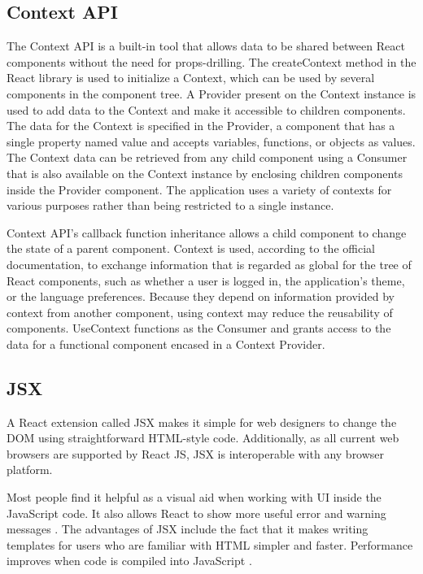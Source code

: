\subsection{Context API}
The Context API is a built-in tool that allows data to be shared between React components without the need for props-drilling. The createContext method in the React library is used to initialize a Context, which can be used by several components in the component tree. A Provider present on the Context instance is used to add data to the Context and make it accessible to children components. The data for the Context is specified in the Provider, a component that has a single property named value and accepts variables, functions, or objects as values. The Context data can be retrieved from any child component using a Consumer that is also available on the Context instance by enclosing children components inside the Provider component. The application uses a variety of contexts for various purposes rather than being restricted to a single instance.

Context API's callback function inheritance allows a child component to change the state of a parent component. Context is used, according to the official documentation, to exchange information that is regarded as global for the tree of React components, such as whether a user is logged in, the application's theme, or the language preferences. Because they depend on information provided by context from another component, using context may reduce the reusability of components. UseContext functions as the Consumer and grants access to the data for a functional component encased in a Context Provider.

\subsection{JSX}
A React extension called JSX makes it simple for web designers to change the DOM using straightforward HTML-style code. Additionally, as all current web browsers are supported by React JS, JSX is interoperable with any browser platform.

Most people find it helpful as a visual aid when working with UI inside the JavaScript code. It also allows React to show more useful error and warning messages \autocite{react2020introducing}. The advantages of JSX include the fact that it makes writing templates for users who are familiar with HTML simpler and faster. Performance improves when code is compiled into JavaScript \autocite{phan2020react}.

